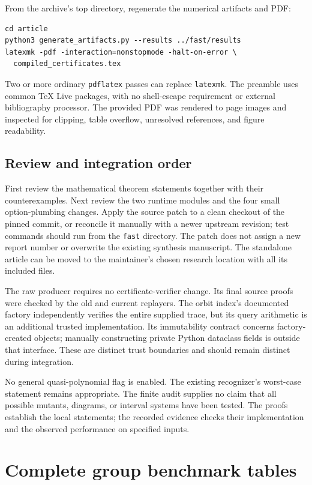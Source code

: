 From the archive's top directory, regenerate the numerical artifacts and PDF:
\begin{verbatim}
cd article
python3 generate_artifacts.py --results ../fast/results
latexmk -pdf -interaction=nonstopmode -halt-on-error \
  compiled_certificates.tex
\end{verbatim}
Two or more ordinary \texttt{pdflatex} passes can replace
\texttt{latexmk}. The preamble uses common TeX Live packages, with no
shell-escape requirement or external bibliography processor. The provided
PDF was rendered to page images and inspected for clipping, table
overflow, unresolved references, and figure readability.

\subsection{Review and integration order}

First review the mathematical theorem statements together with their
counterexamples. Next review the two runtime modules and the four small
option-plumbing changes. Apply the source patch to a clean checkout of
the pinned commit, or reconcile it manually with a newer upstream
revision; test commands should run from the \texttt{fast} directory.
The patch does not assign a new report number or overwrite the existing
synthesis manuscript. The standalone article can be moved to the
maintainer's chosen research location with all its included files.

The raw producer requires no certificate-verifier change. Its final
source proofs were checked by the old and current replayers. The orbit
index's documented factory independently verifies the entire supplied
trace, but its query arithmetic is an additional trusted implementation.
Its immutability contract concerns factory-created objects; manually
constructing private Python dataclass fields is outside that interface.
These are distinct trust boundaries and should remain distinct during
integration.

No general quasi-polynomial flag is enabled. The existing recognizer's
worst-case statement remains appropriate. The finite audit supplies no
claim that all possible mutants, diagrams, or interval systems have been
tested. The proofs establish the local statements; the recorded evidence
checks their implementation and the observed performance on specified
inputs.

\section{Complete group benchmark tables}
\label{app:full-tables}

